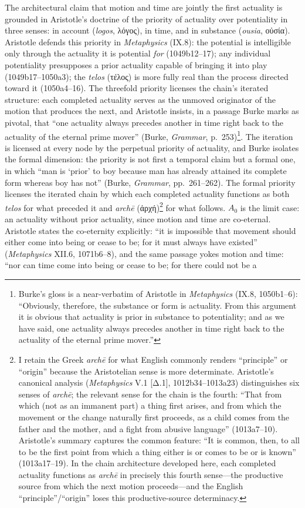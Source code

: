 \documentclass{article}
\newcommand{\gk}[1]{{\greekfont #1}}
\begin{document}
The architectural claim that motion and time are jointly the first actuality is grounded in Aristotle's doctrine of the priority of actuality over potentiality in three senses: in account (\textit{logos}, \gk{λόγος}), in time, and in substance (\textit{ousia}, \gk{οὐσία}). Aristotle defends this priority in \textit{Metaphysics} (IX.8): the potential is intelligible only through the actuality it is potential \textit{for} (1049b12--17); any individual potentiality presupposes a prior actuality capable of bringing it into play (1049b17--1050a3); the \textit{telos} (\gk{τέλος}) is more fully real than the process directed toward it (1050a4--16). The threefold priority licenses the chain's iterated structure: each completed actuality serves as the unmoved originator of the motion that produces the next, and Aristotle insists, in a passage Burke marks as pivotal, that ``one actuality always precedes another in time right back to the actuality of the eternal prime mover'' (Burke, \textit{Grammar}, p.~253)\footnote{Burke's gloss is a near-verbatim of Aristotle in \textit{Metaphysics} (IX.8, 1050b1--6): ``Obviously, therefore, the substance or form is actuality. From this argument it is obvious that actuality is prior in substance to potentiality; and as we have said, one actuality always precedes another in time right back to the actuality of the eternal prime mover.''}. The iteration is licensed at every node by the perpetual priority of actuality, and Burke isolates the formal dimension: the priority is not first a temporal claim but a formal one, in which ``man is `prior' to boy because man has already attained its complete form whereas boy has not'' (Burke, \textit{Grammar}, pp.~261--262). The formal priority licenses the iterated chain by which each completed actuality functions as both \textit{telos} for what preceded it and \textit{archē} (\gk{ἀρχή})\footnote{I retain the Greek \textit{archē} for what English commonly renders ``principle'' or ``origin'' because the Aristotelian sense is more determinate. Aristotle's canonical analysis (\textit{Metaphysics} V.1 [\gk{Δ}.1], 1012b34--1013a23) distinguishes six senses of \textit{archē}; the relevant sense for the chain is the fourth: ``That from which (not as an immanent part) a thing first arises, and from which the movement or the change naturally first proceeds, as a child comes from the father and the mother, and a fight from abusive language'' (1013a7--10). Aristotle's summary captures the common feature: ``It is common, then, to all to be the first point from which a thing either is or comes to be or is known'' (1013a17--19). In the chain architecture developed here, each completed actuality functions as \textit{archē} in precisely this fourth sense---the productive source from which the next motion proceeds---and the English ``principle''/``origin'' loses this productive-source determinacy.} for what follows. $A_0$ is the limit case: an actuality without prior actuality, since motion and time are co-eternal. Aristotle states the co-eternity explicitly: ``it is impossible that movement should either come into being or cease to be; for it must always have existed'' (\textit{Metaphysics} XII.6, 1071b6--8), and the same passage yokes motion and time: ``nor can time come into being or cease to be; for there could not be a 
\end{document}
